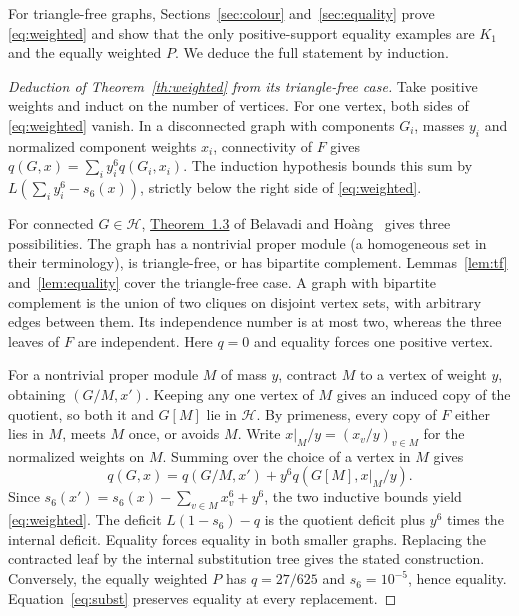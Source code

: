 \documentclass[11pt,a4paper]{article}
\newcommand{\BH}{\mathcal H}
\begin{document}
For triangle-free graphs, Sections~\ref{sec:colour} and~\ref{sec:equality} prove \eqref{eq:weighted} and show that the only positive-support equality examples are \(K_1\) and the equally weighted \(P\). We deduce the full statement by induction.

\begin{proof}[Deduction of Theorem~\ref{th:weighted} from its triangle-free case]
Take positive weights and induct on the number of vertices. For one vertex, both sides of \eqref{eq:weighted} vanish. In a disconnected graph with components \(G_i\), masses \(y_i\) and normalized component weights \(x_i\), connectivity of \(F\) gives \(q(G,x)=\sum_i y_i^6q(G_i,x_i)\). The induction hypothesis bounds this sum by \(L(\sum_i y_i^6-s_6(x))\), strictly below the right side of \eqref{eq:weighted}.

For connected \(G\in\BH\), \href{https://arxiv.org/html/2604.27594v3#S1.Thmtheorem3}{Theorem~1.3} of Belavadi and Ho\`ang~\cite{bh} gives three possibilities. The graph has a nontrivial proper module (a homogeneous set in their terminology), is triangle-free, or has bipartite complement. Lemmas~\ref{lem:tf} and~\ref{lem:equality} cover the triangle-free case. A graph with bipartite complement is the union of two cliques on disjoint vertex sets, with arbitrary edges between them. Its independence number is at most two, whereas the three leaves of \(F\) are independent. Here \(q=0\) and equality forces one positive vertex.

For a nontrivial proper module \(M\) of mass \(y\), contract \(M\) to a vertex of weight \(y\), obtaining \((G/M,x')\). Keeping any one vertex of \(M\) gives an induced copy of the quotient, so both it and \(G[M]\) lie in \(\BH\). By primeness, every copy of \(F\) either lies in \(M\), meets \(M\) once, or avoids \(M\). Write \(x|_M/y=(x_v/y)_{v\in M}\) for the normalized weights on \(M\). Summing over the choice of a vertex in \(M\) gives
\begin{equation}\label{eq:subst}
 q(G,x)=q(G/M,x')+y^6 q(G[M],x|_M/y).
\end{equation}
Since \(s_6(x')=s_6(x)-\sum_{v\in M}x_v^6+y^6\), the two inductive bounds yield \eqref{eq:weighted}. The deficit \(L(1-s_6)-q\) is the quotient deficit plus \(y^6\) times the internal deficit. Equality forces equality in both smaller graphs. Replacing the contracted leaf by the internal substitution tree gives the stated construction. Conversely, the equally weighted \(P\) has \(q=27/625\) and \(s_6=10^{-5}\), hence equality. Equation~\eqref{eq:subst} preserves equality at every replacement.
\end{proof}
\end{document}
